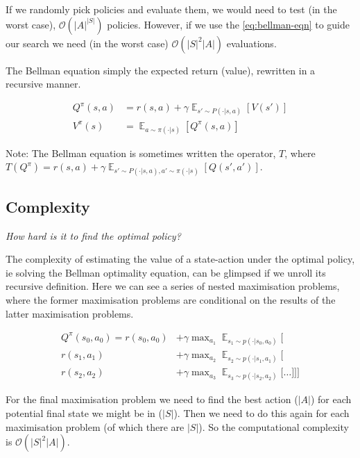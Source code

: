 If we randomly pick policies and evaluate them, we would need to test (in the worst case),
$\mathcal O(|A|^{|S|})$ policies. However, if we use the \ref{eq:bellman-eqn} to
guide our search we need (in the worst case) $\mathcal O(|S|^2|A|)$ evaluations.

The Bellman equation simply the expected return (value), rewritten in a recursive manner.

\begin{align*}
Q^{\pi}(s, a) &= r(s, a) + \gamma \mathop{\mathbb E}_{s' \sim P(\cdot|s, a)} [V(s')] \label{eq:bellman-eqn}\tag{Bellman equation}\\
V^{\pi}(s) &= \mathop{\mathbb E}_{a \sim \pi(\cdot|s)} [Q^{\pi}(s, a)]
\end{align*}

Note: The Bellman equation is sometimes written the operator, $T$, where
$T(Q^{\pi}) = r(s, a) + \gamma \mathop{\mathbb E}_{s' \sim P(\cdot|s, a), a'\sim \pi(\cdot | s)} [Q(s', a')]$.

\subsection{Complexity}

\begin{displayquote}
  \textit{How hard is it to find the optimal policy?}
\end{displayquote}

The complexity of estimating the value of a state-action under the optimal policy, ie solving the Bellman optimality
equation, can be glimpsed if we unroll its recursive definition.
Here we can see a series of nested maximisation problems, where the former
maximisation problems are conditional on the results of the latter maximisation problems.

\begin{align*}
Q^{\pi}(s_0, a_0) = r(s_0, a_0) &+ \gamma \mathop{\text{max}}_{a_1} \mathop{\mathbb E}_{s_1\sim p(\cdot | s_0, a_0)} \Bigg[ \\
r(s_1, a_1)  &+ \gamma \mathop{\text{max}}_{a_2} \mathop{\mathbb E}_{s_2\sim p(\cdot | s_1, a_1)} \bigg[\\
r(s_2, a_2)  &+ \gamma \mathop{\text{max}}_{a_3} \mathop{\mathbb E}_{s_3\sim p(\cdot | s_2, a_2)} \Big[
\dots \Big] \bigg] \Bigg]
\end{align*}


For the final maximisation problem we need to find the best action ($|A|$) for each potential final state we might be in ($|S|$).
Then we need to do this again for each maximisation problem (of which there are $|S|$).
So the computational complexity is $\mathcal O(|S|^2|A|)$.

